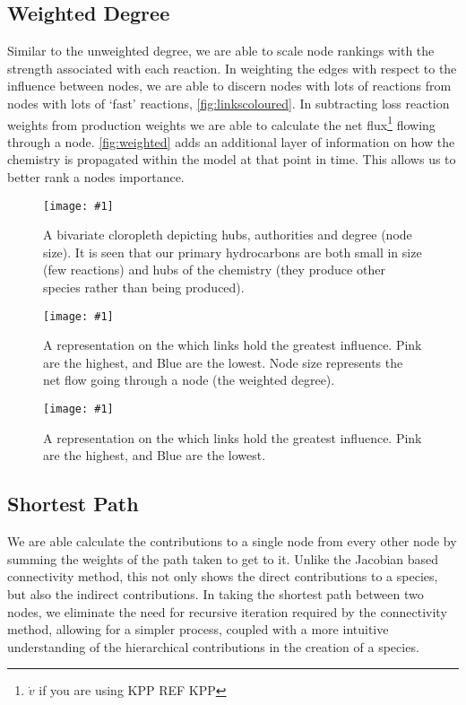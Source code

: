\documentclass[twoside,reqno]{article}
\newcommand{\qfig}[4]{\begin{figure}[H]\centering\texttt{[image: \#1]}\caption{#3}\label{#2}\end{figure}\newpage}
\begin{document}
\subsection{Weighted Degree}
Similar to the unweighted degree, we are able to scale node rankings with the strength associated with each reaction. In weighting the edges with respect to the influence between nodes, we are able to discern nodes with lots of reactions from nodes with lots of `fast' reactions, \autoref{fig:linkscoloured}. In subtracting loss reaction weights from production weights we are able to calculate the net flux\footnote{$\dot{v}$ if you are using KPP {REF KPP}} flowing through a node. \autoref{fig:weighted} adds an additional layer of information on how the chemistry is propagated within the model at that point in time. This allows us to better rank a nodes importance.

\qfig{newfigs/ch2_hubs_auth.pdf}{fig:degree}{
A bivariate cloropleth depicting hubs, authorities and degree (node size). It is seen that our primary hydrocarbons are both small in size (few reactions) and hubs of the chemistry (they produce other species rather than being produced). }{\textwidth}

\qfig{newfigs/ch2_weighted.pdf}{fig:linkscoloured}{A representation on the which links hold the greatest influence. Pink are the highest, and Blue are the lowest. Node size represents the net flow going through a node (the weighted degree). }{\textwidth}

\qfig{newfigs/ch2_weighted_degree.pdf}{fig:weighted}{A representation on the which links hold the greatest influence. Pink are the highest, and Blue are the lowest.}{\textwidth}




\subsection{Shortest Path}
We are able calculate the contributions to a single node from every other
node by summing the weights of the path taken to get to it. Unlike the Jacobian based connectivity method, this not only shows the direct contributions to a species, but also the indirect contributions. In taking the shortest path between two nodes, we eliminate the need for recursive iteration required by the connectivity method, allowing for a simpler process, coupled with a more intuitive understanding of the hierarchical contributions in the creation of a species.
\end{document}
